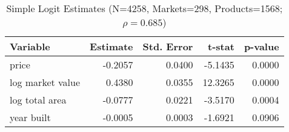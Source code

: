 \begin{table}[!htbp]
\centering
\caption{Simple Logit Estimates (N=4258, Markets=298, Products=1568; $\rho=0.685$)}
\label{tab:blp_logit_coef}
\begin{tabular}{lrrrr}
\toprule
Variable & Estimate & Std. Error & t-stat & p-value \\
\midrule
price & -0.2057 & 0.0400 & -5.1435 & 0.0000 \\
log market value & 0.4380 & 0.0355 & 12.3265 & 0.0000 \\
log total area & -0.0777 & 0.0221 & -3.5170 & 0.0004 \\
year built & -0.0005 & 0.0003 & -1.6921 & 0.0906 \\
\bottomrule
\end{tabular}

\end{table}
